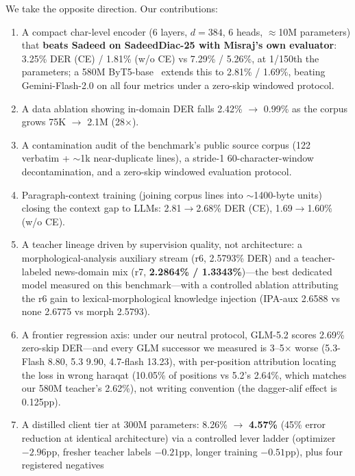 \documentclass[11pt]{article}
\begin{document}
We take the opposite direction. Our contributions:
\begin{enumerate}
  \item A compact char-level encoder (6 layers, $d=384$, 6 heads,
        $\approx$10M parameters) that \textbf{beats Sadeed on
        SadeedDiac-25 with Misraj's own evaluator}: 3.25\% DER (CE) /
        1.81\% (w/o CE) vs 7.29\% / 5.26\%, at 1/150th the parameters;
        a 580M ByT5-base~\cite{byt5} extends this to 2.81\% / 1.69\%,
        beating Gemini-Flash-2.0 on all four metrics under a zero-skip
        windowed protocol.
  \item A data ablation showing in-domain DER falls 2.42\% $\rightarrow$ 0.99\% as
        the corpus grows 75K $\rightarrow$ 2.1M (28$\times$).
  \item A contamination audit of the benchmark's public source corpus
        (122 verbatim + ${\sim}$1k near-duplicate lines), a
        stride-1 60-character-window decontamination, and a
        zero-skip windowed evaluation protocol.
  \item Paragraph-context training (joining corpus lines into
        ${\sim}$1400-byte units) closing the context gap to LLMs:
        2.81$\rightarrow$2.68\% DER (CE), 1.69$\rightarrow$1.60\% (w/o CE).
  \item A teacher lineage driven by supervision quality, not
        architecture: a morphological-analysis auxiliary stream
        (r6, 2.5793\% DER) and a teacher-labeled news-domain mix
        (r7, \textbf{2.2864\% / 1.3343\%})---the best dedicated model
        measured on this benchmark---with a controlled ablation
        attributing the r6 gain to lexical-morphological knowledge
        injection (IPA-aux 2.6588 vs none 2.6775 vs morph 2.5793).
  \item A frontier regression axis: under our neutral protocol,
        GLM-5.2 scores 2.69\% zero-skip DER---and every GLM successor
        we measured is 3--5$\times$ worse (5.3-Flash 8.80, 5.3 9.90,
        4.7-flash 13.23), with per-position attribution locating the
        loss in wrong haraqat (10.05\% of positions vs 5.2's 2.64\%,
        which matches our 580M teacher's 2.62\%), not writing
        convention (the dagger-alif effect is 0.125pp).
  \item A distilled client tier at 300M parameters: 8.26\%
        $\rightarrow$ \textbf{4.57\%} (45\% error reduction at
        identical architecture) via a controlled lever ladder
        (optimizer $-2.96$pp, fresher teacher labels $-0.21$pp,
        longer training $-0.51$pp), plus four registered negatives

\end{enumerate}
\end{document}
